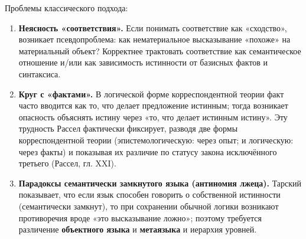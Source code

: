 \documentclass[a4paper,12pt]{article}
\begin{document}
Проблемы классического подхода:
\begin{enumerate}
  \item \textbf{Неясность «соответствия».} Если понимать соответствие как «сходство», возникает псевдопроблема: как нематериальное высказывание «похоже» на материальный объект? Корректнее трактовать соответствие как семантическое отношение и/или как зависимость истинности от базисных фактов и синтаксиса.
  \item \textbf{Круг с «фактами».} В логической форме корреспондентной теории факт часто вводится как то, что делает предложение истинным; тогда возникает опасность объяснять истину через «то, что делает истинным истину». Эту трудность Рассел фактически фиксирует, разводя две формы корреспондентной теории (эпистемологическую: через опыт; и логическую: через факты) и показывая их различие по статусу закона исключённого третьего (Рассел, гл. XXI).
  \item \textbf{Парадоксы семантически замкнутого языка (антиномия лжеца).} Тарский показывает, что если язык способен говорить о собственной истинности (семантически замкнут), то при сохранении обычной логики возникают противоречия вроде «это высказывание ложно»; поэтому требуется различение \textbf{объектного языка} и \textbf{метаязыка} и иерархия уровней.
\end{enumerate}
\end{document}
